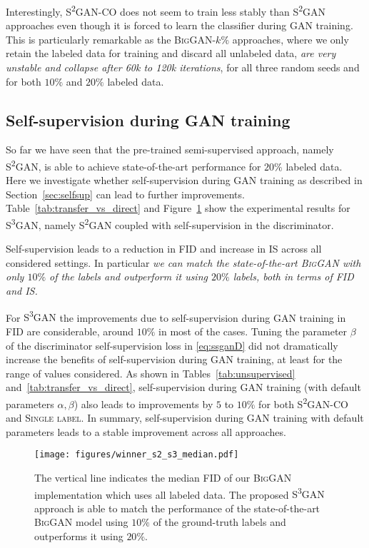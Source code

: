 \documentclass{article}
\newcommand{\cotrainSS}{\textsc{S\textsuperscript{2}GAN-CO}}
\newcommand{\tranSS}{\textsc{S\textsuperscript{2}GAN}}
\newcommand{\tranSSS}{\textsc{S\textsuperscript{3}GAN}}
\newcommand{\slabels}{\textsc{Single label}}
\newcommand{\biggan}{\textsc{BigGAN}}
\begin{document}
Interestingly, \cotrainSS{} does not seem to train less stably than \tranSS{} approaches even though it is forced to learn the classifier during GAN training. This is particularly remarkable as the \biggan{}-$k\%$ approaches, where we only retain the labeled data for training and discard all unlabeled data, \emph{are very unstable and collapse after 60k to 120k iterations}, for all three random seeds and for both $10\%$ and $20\%$ labeled data.


\subsection{Self-supervision during GAN training}
So far we have seen that the pre-trained semi-supervised approach, namely \tranSS{}, is able to achieve state-of-the-art performance for $20\%$ labeled data. Here we investigate whether self-supervision during GAN training as described in Section~\ref{sec:selfsup} can lead to further improvements. Table~\ref{tab:transfer_vs_direct} and Figure~\ref{fig:barwinner} show the experimental results for \tranSSS{}, namely \tranSS{} coupled with self-supervision in the discriminator.

Self-supervision leads to a reduction in FID and increase in IS across all considered settings. In particular \emph{we can match the state-of-the-art \biggan{} with only $10\%$ of the labels and outperform it using $20\%$ labels, both in terms of FID and IS.}

For \tranSSS{} the improvements due to self-supervision during GAN training in FID are considerable, around $10\%$ in most of the cases. Tuning the parameter $\beta$ of the discriminator self-supervision loss in \eqref{eq:ssganD} did not dramatically increase the benefits of self-supervision during GAN training, at least for the range of values considered. 
As shown in Tables~\ref{tab:unsupervised} and~\ref{tab:transfer_vs_direct}, self-supervision during GAN training (with default parameters $\alpha, \beta$) also leads to improvements by $5$ to $10\%$ for both \cotrainSS{} and \slabels{}. In summary, self-supervision during GAN training with default parameters leads to a stable improvement across all approaches.

\begin{figure}[t]
\vspace{0.5cm}
\centering
\texttt{[image: figures/winner\_s2\_s3\_median.pdf]}
\caption{\label{fig:barwinner}The vertical line indicates the median FID of our \biggan{} implementation which uses all labeled data. The proposed \tranSSS{} approach is able to match the performance of the state-of-the-art \biggan{} model using $10\%$ of the ground-truth labels and outperforms it using $20\%$.} 
\end{figure}
\end{document}
